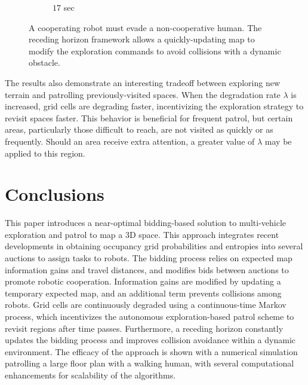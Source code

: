 \documentclass[smallextended]{svjour3}       %
\begin{document}
\begin{figure}[!t]
\begin{subfigure}[t]{0.3\columnwidth}
        		\caption{$17$ sec}
    	\end{subfigure}
	\caption{A cooperating robot must evade a non-cooperative human. The receding horizon framework allows a quickly-updating map to modify the exploration commands to avoid collisions with a dynamic obstacle.}
	\label{fig:EvadeHuman}
\end{figure}

The results also demonstrate an interesting tradeoff between exploring new terrain and patrolling previously-visited spaces. When the degradation rate $\lambda$ is increased, grid cells are degrading faster, incentivizing the exploration strategy to revisit spaces faster. This behavior is beneficial for frequent patrol, but certain areas, particularly those difficult to reach, are not visited as quickly or as frequently. Should an area receive extra attention, a greater value of $\lambda$ may be applied to this region.


\section{Conclusions}
\label{sec:Conclusions}

This paper introduces a near-optimal bidding-based solution to multi-vehicle exploration and patrol to map a 3D space. This approach integrates recent developments in obtaining occupancy grid probabilities and entropies into several auctions to assign tasks to robots. The bidding process relies on expected map information gains and travel distances, and modifies bids between auctions to promote robotic cooperation. Information gains are modified by updating a temporary expected map, and an additional term prevents collisions among robots. Grid cells are continuously degraded using a continuous-time Markov process, which incentivizes the autonomous exploration-based patrol scheme to revisit regions after time passes. Furthermore, a receding horizon constantly updates the bidding process and improves collision avoidance within a dynamic environment. The efficacy of the approach is shown with a numerical simulation patrolling a large floor plan with a walking human, with several computational enhancements for scalability of the algorithms.


%
%
%
\end{document}
